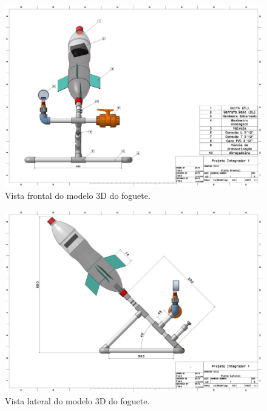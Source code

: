 \begin{figure}[H]
	\centering
	\includegraphics[width=1\textwidth,height=\textheight,keepaspectratio]{figuras/estruturas/foto_modelo_medidas.jpg}
	\caption{Vista frontal do modelo 3D do foguete.}
	\label{fig_foguete_medidas}
\end{figure}

\begin{figure}[H]
	\centering
	\includegraphics[width=1\textwidth,height=\textheight,keepaspectratio]{figuras/estruturas/modelo_medidas_lado.jpg}
	\caption{Vista lateral do modelo 3D do foguete.}
	\label{fig_foguete_medidas_lado}
\end{figure}


